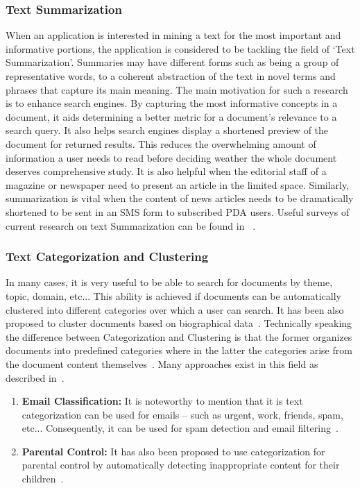 \documentclass[a4,12pt]{report}
\begin{document}
	\subsubsection{Text Summarization} 
		When an application is interested in mining a text for the most important and informative portions,
		the application is considered to be tackling the field of `Text Summarization'. Summaries may have different forms such as being 
		a group of representative words, to a coherent abstraction of the text in novel terms and phrases that capture its main meaning. 
		The main motivation
		for such a research is to enhance search engines. By capturing the most informative concepts in a document, it aids determining a 
		better metric for a document's relevance to a search query. It also helps search engines display a shortened preview of the document for returned
		results. This reduces the overwhelming amount of information a user needs to read before deciding weather the whole document deserves
		comprehensive study. It is also helpful when the editorial staff of a magazine or newspaper need to present an article in the limited space.
		Similarly, summarization is vital when the content of 
		news articles needs to be dramatically shortened to be sent in an SMS form to subscribed PDA users. 
		Useful surveys of current research on text Summarization can be
		found in ~\cite{Radev:02,Das:07}.
	\subsubsection{Text Categorization and Clustering} 
		In many cases, it is very useful to be able to search for documents by theme, topic, domain, etc...
		This ability is achieved if documents can be automatically clustered into different categories over which a user can search. It has been also 
		proposed to cluster documents based on biographical data~\cite{Kostoff:99}. Technically speaking the difference between Categorization and
		Clustering is that the former organizes documents into predefined categories where in the latter the categories arise from the document content
		themselves~\cite{sharp:01}. Many approaches exist in this field as described in~\cite{Berry:03, Aas:99, MUNTEANU:05}.
		\begin{enumerate}
		\item \textbf{Email Classification:} It is noteworthy to mention that it is text categorization can be used for emails 
			-- such as urgent, work, friends, spam, etc... Consequently, it can be used for spam detection and email 
			filtering~\cite{Mock:01,bekkerman:04}.
		\item \textbf{Parental Control:} It has also been proposed to use categorization for parental control by
			automatically detecting inappropriate content for their children~\cite{Kontostathis:09}.
		\end{enumerate}
\end{document}
